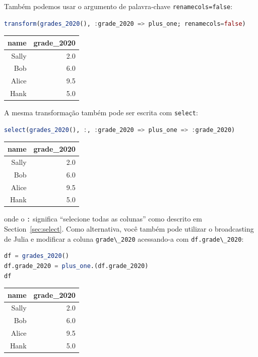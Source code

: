 \documentclass[
  notoc %
]{tufte-book}
\newcommand{\passthrough}[1]{#1}
\begin{document}
Também podemos usar o argumento de palavra-chave
\passthrough{\lstinline!renamecols=false!}:

\begin{lstlisting}[language=Julia]
transform(grades_2020(), :grade_2020 => plus_one; renamecols=false)
\end{lstlisting}

\begin{longtable}[]{@{}rr@{}}
\toprule
name & grade\_2020 \\
\midrule
\endhead
Sally & 2.0 \\
Bob & 6.0 \\
Alice & 9.5 \\
Hank & 5.0 \\
\bottomrule
\end{longtable}

A mesma transformação também pode ser escrita com
\passthrough{\lstinline!select!}:

\begin{lstlisting}[language=Julia]
select(grades_2020(), :, :grade_2020 => plus_one => :grade_2020)
\end{lstlisting}

\begin{longtable}[]{@{}rr@{}}
\toprule
name & grade\_2020 \\
\midrule
\endhead
Sally & 2.0 \\
Bob & 6.0 \\
Alice & 9.5 \\
Hank & 5.0 \\
\bottomrule
\end{longtable}

onde o \passthrough{\lstinline!:!} significa ``selecione todas as
colunas'' como descrito em Section~\ref{sec:select}. Como alternativa,
você também pode utilizar o broadcasting de Julia e modificar a coluna
\passthrough{\lstinline!grade\_2020!} acessando-a com
\passthrough{\lstinline!df.grade\_2020!}:

\begin{lstlisting}[language=Julia]
df = grades_2020()
df.grade_2020 = plus_one.(df.grade_2020)
df
\end{lstlisting}

\begin{longtable}[]{@{}rr@{}}
\toprule
name & grade\_2020 \\
\midrule
\endhead
Sally & 2.0 \\
Bob & 6.0 \\
Alice & 9.5 \\
Hank & 5.0 \\
\bottomrule
\end{longtable}
\end{document}
